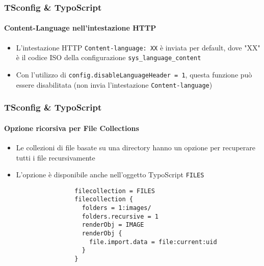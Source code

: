 
\begin{frame}[fragile]
	\frametitle{TSconfig \& TypoScript}
	\framesubtitle{Content-Language nell'intestazione HTTP}

	\begin{itemize}

		\item L'intestazione HTTP \texttt{Content-language: XX} è inviata per default, dove "XX" è il codice ISO della
			configurazione \texttt{sys\_language\_content} 

		\item Con l'utilizzo di \texttt{config.disableLanguageHeader = 1}, questa funzione può essere disabilitata
			(non invia l'intestazione \texttt{Content-language})

	\end{itemize}

\end{frame}


\begin{frame}[fragile]
	\frametitle{TSconfig \& TypoScript}
	\framesubtitle{Opzione ricorsiva per File Collections}

	\begin{itemize}

		\item Le collezioni di file basate su una directory hanno un opzione per recuperare tutti i file recursivamente

		\item L'opzione è disponibile anche nell'oggetto TypoScript \texttt{FILES}

			\begin{lstlisting}
				filecollection = FILES
				filecollection {
				  folders = 1:images/
				  folders.recursive = 1
				  renderObj = IMAGE
				  renderObj {
				    file.import.data = file:current:uid
				  }
				}
			\end{lstlisting}

	\end{itemize}

\end{frame}

